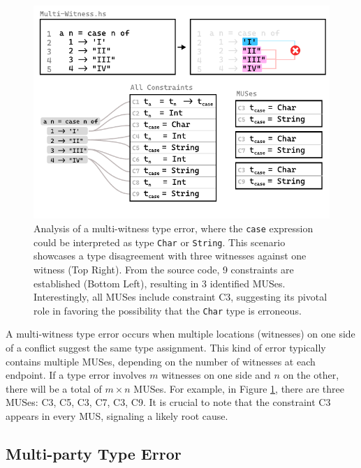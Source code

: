 \begin{figure}[hbt]
    \centering
\includegraphics[width=\linewidth]{Multi-Witness-MUS}
  \caption[Illustration of a multi-witness type error in the context of MUSes]{\label{fig:multi-witness-2}
  Analysis of a multi-witness type error, where the \texttt{case} expression could be interpreted as type \texttt{Char} or \texttt{String}. This scenario showcases a type disagreement with three witnesses against one witness (Top Right). From the source code, 9 constraints are established (Bottom Left), resulting in 3 identified MUSes. Interestingly, all MUSes include constraint C3, suggesting its pivotal role in favoring the possibility that the \texttt{Char} type is erroneous.}
  \end{figure}

A multi-witness type error occurs when multiple locations (witnesses) on one side of a conflict suggest the same type assignment. This kind of error typically contains multiple MUSes, depending on the number of witnesses at each endpoint. If a type error involves $m$ witnesses on one side and $n$ on the other, there will be a total of $m \times n$ MUSes. For example, in Figure \ref{fig:multi-witness-2}, there are three MUSes: {C3, C5}, {C3, C7}, {C3, C9}. It is crucial to note that the constraint C3 appears in every MUS, signaling a likely root cause.

\subsection{Multi-party Type Error}

